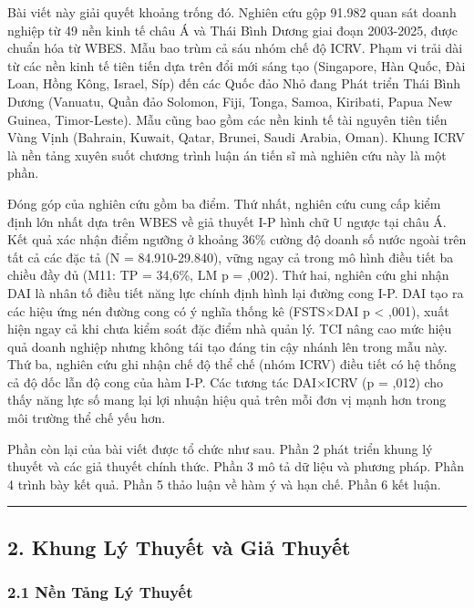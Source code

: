 \documentclass[12pt,a4paper]{article}
\begin{document}
Bài viết này giải quyết khoảng trống đó. Nghiên cứu gộp 91.982 quan sát
doanh nghiệp từ 49 nền kinh tế châu Á và Thái Bình Dương giai đoạn
2003-2025, được chuẩn hóa từ WBES. Mẫu bao trùm cả sáu nhóm chế độ ICRV.
Phạm vi trải dài từ các nền kinh tế tiên tiến dựa trên đổi mới sáng tạo
(Singapore, Hàn Quốc, Đài Loan, Hồng Kông, Israel, Síp) đến các Quốc đảo
Nhỏ đang Phát triển Thái Bình Dương (Vanuatu, Quần đảo Solomon, Fiji,
Tonga, Samoa, Kiribati, Papua New Guinea, Timor-Leste). Mẫu cũng bao gồm
các nền kinh tế tài nguyên tiên tiến Vùng Vịnh (Bahrain, Kuwait, Qatar,
Brunei, Saudi Arabia, Oman). Khung ICRV là nền tảng xuyên suốt chương
trình luận án tiến sĩ mà nghiên cứu này là một phần.

Đóng góp của nghiên cứu gồm ba điểm. Thứ nhất, nghiên cứu cung cấp kiểm
định lớn nhất dựa trên WBES về giả thuyết I-P hình chữ U ngược tại châu
Á. Kết quả xác nhận điểm ngưỡng ở khoảng 36\% cường độ doanh số nước
ngoài trên tất cả các đặc tả (N = 84.910-29.840), vững ngay cả trong mô
hình điều tiết ba chiều đầy đủ (M11: TP = 34,6\%, LM p = ,002). Thứ hai,
nghiên cứu ghi nhận DAI là nhân tố điều tiết năng lực chính định hình
lại đường cong I-P. DAI tạo ra các hiệu ứng nén đường cong có ý nghĩa
thống kê (FSTS×DAI p \textless{} ,001), xuất hiện ngay cả khi chưa kiểm
soát đặc điểm nhà quản lý. TCI nâng cao mức hiệu quả doanh nghiệp nhưng
không tái tạo đáng tin cậy nhánh lên trong mẫu này. Thứ ba, nghiên cứu
ghi nhận chế độ thể chế (nhóm ICRV) điều tiết có hệ thống cả độ dốc lẫn
độ cong của hàm I-P. Các tương tác DAI×ICRV (p = ,012) cho thấy năng lực
số mang lại lợi nhuận hiệu quả trên mỗi đơn vị mạnh hơn trong môi trường
thể chế yếu hơn.

Phần còn lại của bài viết được tổ chức như sau. Phần 2 phát triển khung
lý thuyết và các giả thuyết chính thức. Phần 3 mô tả dữ liệu và phương
pháp. Phần 4 trình bày kết quả. Phần 5 thảo luận về hàm ý và hạn chế.
Phần 6 kết luận.

\begin{center}\rule{0.5\linewidth}{0.5pt}\end{center}

\hypertarget{2-khung-luxfd-thuyux1ebft-vuxe0-giux1ea3-thuyux1ebft}{%
\subsection{2. Khung Lý Thuyết và Giả
Thuyết}\label{2-khung-luxfd-thuyux1ebft-vuxe0-giux1ea3-thuyux1ebft}}

\hypertarget{21-nux1ec1n-tux1ea3ng-luxfd-thuyux1ebft}{%
\subsubsection{2.1 Nền Tảng Lý
Thuyết}\label{21-nux1ec1n-tux1ea3ng-luxfd-thuyux1ebft}}
\end{document}
